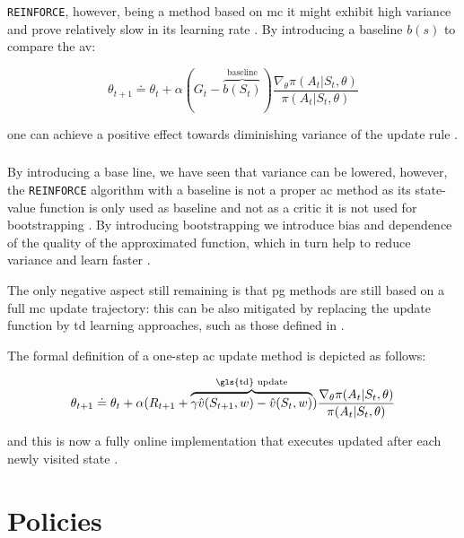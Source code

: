 \documentclass{seal_thesis}
\begin{document}
\texttt{REINFORCE}, however, being a method based on \gls{mc} it might exhibit high variance and prove relatively slow in its learning rate \cite[p. 271]{Sutton2017}. By introducing a baseline $b(s)$ to compare the \gls{av}:

\begin{equation}
	\theta_{t+1} \doteq \theta_t + \alpha (G_t - \overbrace{b(S_t)}^{\text{baseline}}) \frac{\nabla_\theta \pi(A_t|S_t,\theta)}{\pi(A_t|S_t,\theta)}
\end{equation}

one can achieve a positive effect towards diminishing variance of the update rule \cite[p. 271]{Sutton2017}.

\subsubsection{ }

By introducing a base line, we have seen that variance can be lowered, however, the \texttt{REINFORCE} algorithm with a baseline is not a proper \gls{ac} method as its state-value function is only used as baseline and not as a critic \ie it is not used for bootstrapping \cite[p. 273]{Sutton2017}. By introducing bootstrapping we introduce bias and dependence of the quality of the approximated function, which in turn help to reduce variance and learn faster \cite[p. 273]{Sutton2017}. 

The only negative aspect still remaining is that \gls{pg} methods are still based on a full \gls{mc} update trajectory: this can be also mitigated by replacing the update function by \gls{td} learning approaches, such as those defined in  \cite[p. 273]{Sutton2017}.

The formal definition of a one-step \gls{ac} update method is depicted as follows:

\begin{equation}
	\theta_{t+1} \doteq \theta_t + \alpha(R_{t+1} + \overbrace{\gamma \hat{v}(S_{t+1},w)-\hat{v}(S_t,w)}^{\text{\gls{td} update}}) \frac{\nabla_\theta \pi(A_t|S_t,\theta)}{\pi(A_t|S_t,\theta)}
\end{equation}

and this is now a fully online implementation that executes updated after each newly visited state \cite[p. 274]{Sutton2017}. 

\section{ Policies}
\label{sec:rl_policies}
\end{document}
